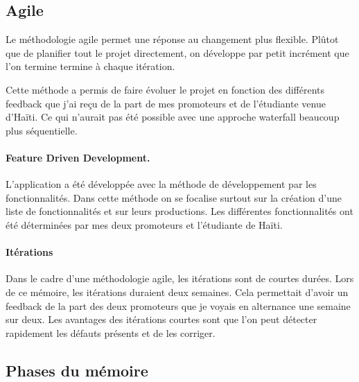 \documentclass{EPL-master-thesis-covers-FR}
\begin{document}
			\subsection*{Agile}
				Le méthodologie agile permet une réponse au changement plus flexible. Plûtot que de planifier tout le projet directement, on développe par petit incrément que l'on termine termine à chaque itération. 
				
				Cette méthode a permis de faire évoluer le projet en fonction des différents feedback que j'ai reçu de la part de mes promoteurs et de l'étudiante venue d'Haïti. Ce qui n'aurait pas été possible avec une approche waterfall beaucoup plus séquentielle.
				
				\paragraph*{Feature Driven Development.} L'application a été développée avec la méthode de développement par les fonctionnalités. Dans cette méthode on se focalise surtout sur la création d'une liste de fonctionnalités et sur leurs productions. Les différentes fonctionnalités ont été déterminées par mes deux promoteurs et l'étudiante de Haïti.
				
				\paragraph*{Itérations} Dans le cadre d'une méthodologie agile, les itérations sont de courtes durées. Lors de ce mémoire, les itérations duraient deux semaines. Cela permettait d'avoir un feedback de la part des deux promoteurs que je voyais en alternance une semaine sur deux.
				Les avantages des itérations courtes sont que l'on peut détecter rapidement les défauts présents et de les corriger. 


			\subsection*{Phases du mémoire}
			
\end{document}

